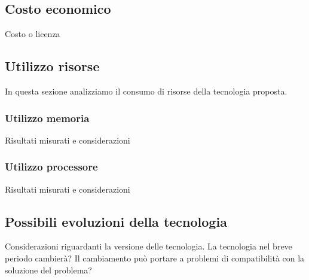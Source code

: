 \documentclass[./../Technology Baseline.tex]{subfiles}
\begin{document}
\subsection{Costo economico}
Costo o licenza
\subsection{Utilizzo risorse}
In questa sezione analizziamo il consumo di risorse della tecnologia proposta.
\subsubsection{Utilizzo memoria}
Risultati misurati e considerazioni
\subsubsection{Utilizzo processore}
Risultati misurati e considerazioni
\subsection{Possibili evoluzioni della tecnologia}
Considerazioni riguardanti la versione delle tecnologia.
La tecnologia nel breve periodo cambierà? Il cambiamento può portare a problemi di compatibilità con la soluzione del problema?
\end{document}
